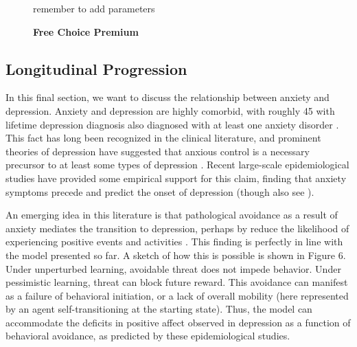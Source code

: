 \documentclass[11pt]{article} %
\begin{document}
\begin{figure}
  \centerline{%
  }
  \caption{\textbf{Free Choice Premium}}
  \par remember to add parameters
\end{figure}

\subsection{Longitudinal Progression}

In this final section, we want to discuss the relationship between anxiety and
depression. Anxiety and depression are highly comorbid, with roughly 45%
with lifetime depression diagnosis also diagnosed with at least one anxiety disorder
\citep{kessler2015}. This fact has long been recognized in the clinical literature,
and prominent theories of depression have suggested that anxious control is a necessary
precursor to at least some types of depression \citep{alloy1990}. Recent large-scale
epidemiological studies have provided  some empirical support for this claim, finding that
anxiety symptoms precede and predict the onset of depression \citep{mathew2011, jacobson2014,
kessler2015} (though also see \cite{jacobson2017, plana2019}).

An emerging idea in this literature is that pathological avoidance as a result
of anxiety mediates the transition to depression, perhaps by reduce the likelihood
of experiencing positive events and activities \citep{moitra2008, jacobson2014}.
This finding is perfectly in line with the model presented so far. A sketch of
how this is possible is shown in Figure 6. Under unperturbed learning, avoidable
threat does not impede behavior. Under pessimistic learning, threat can block
future reward. This avoidance can manifest as a failure of behavioral initiation,
or a lack of overall mobility (here represented by an agent self-transitioning
at the starting state). Thus, the model can accommodate the deficits in positive
affect observed in depression as a function of behavioral avoidance, as predicted
by these epidemiological studies.
\end{document}

